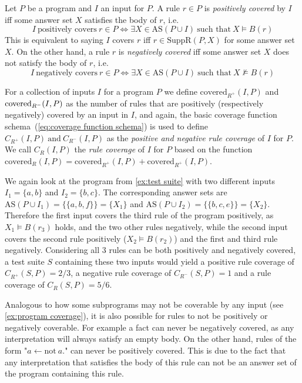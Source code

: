 \begin{definition}
\label{def:rule coverage}
    Let $P$ be a program and $I$ an input for $P$. A rule \(r \in P\) is \emph{positively covered} by $I$ iff some answer set $X$ satisfies the body of $r$, i.e. 
    \[
        I\ \text{positively covers}\ r \in P \Longleftrightarrow \exists X \in \text{AS}(P \cup I)\ \text{such that}\ X \models B(r)
    \]
    This is equivalent to saying $I$ covers $r$ iff \(r \in \text{SuppR}(P, X)\) for some answer set $X$. On the other hand, a rule $r$ is \emph{negatively covered} iff some answer set $X$ does not satisfy the body of $r$, i.e.  
    \[
        I\ \text{negatively covers}\ r \in P \Longleftrightarrow \exists X \in \text{AS}(P \cup I)\ \text{such that}\ X \not\models B(r)
    \]
\end{definition}

For a collection of inputs $I$ for a program $P$ we define \(\text{covered}_{R^+}(I, P)\) and \(\text{covered}_{R^-}\\(I, P)\) as the number of rules that are positively (respectively negatively) covered by an input in $I$, and again, the basic coverage function schema~(\ref{eq:coverage function schema}) is used to define \(C_{R^+}(I, P)\ \text{and}\ C_{R^-}(I, P)\) as the \emph{positive and negative rule coverage} of $I$ for $P$. We call \(C_R(I, P)\) the \emph{rule coverage} of $I$ for $P$ based on the function \(\text{covered}_{R}(I, P) = \text{covered}_{R^+}(I, P) + \text{covered}_{R^+}(I, P)\).

\begin{example}
\label{ex:rule coverage}
    We again look at the program from \cref{ex:test suite} with two different inputs \(I_1 = \{a, b\}\) and \(I_2 = \{b, c\}\). The corresponding answer sets are \(\text{AS}(P \cup I_1) = \{\{a, b, f\}\} = \{X_1\}\) and \(\text{AS}(P \cup I_2) = \{\{b, c, e\}\} = \{X_2\}\). Therefore the first input covers the third rule of the program positively, as \(X_1 \models B(r_3)\) holds, and the two other rules negatively, while the second input covers the second rule positively (\(X_2 \models B(r_2)\)) and the first and third rule negatively. Considering all 3 rules can be both positively and negatively covered, a test suite $S$ containing these two inputs would yield a positive rule coverage of \(C_{R^+}(S, P) = 2/3\), a negative rule coverage of \(C_{R^-}(S, P) = 1\) and a rule coverage of \(C_R(S, P) = 5/6\).
\end{example}

Analogous to how some subprograms may not be coverable by any input (see \cref{ex:program coverage}), it is also possible for rules to not be positively or negatively coverable. For example a fact can never be negatively covered, as any interpretation will always satisfy an empty body. On the other hand, rules of the form "\(a \leftarrow \text{not}\ a.\)" can never be positively covered. This is due to the fact that any interpretation that satisfies the body of this rule can not be an answer set of the program containing this rule.

